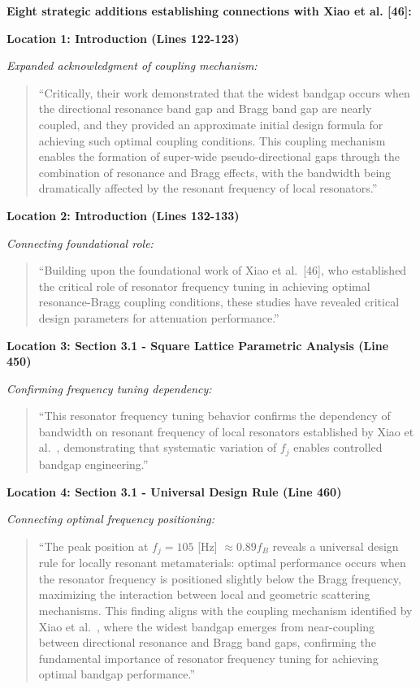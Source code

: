 \documentclass[11pt,a4paper]{article}
\newenvironment{changesbox}{%
    \par\medskip\noindent{\color{changescolor}\rule{\linewidth}{2pt}}\par
    \noindent{\color{changescolor}\bfseries Manuscript Changes}\par\smallskip
}{%
    \par\noindent{\color{changescolor}\rule{\linewidth}{0.5pt}}\medskip
}
\begin{document}
\begin{changesbox}
\textbf{Eight strategic additions establishing connections with Xiao et al. [46]:}

\textbf{Location 1: Introduction (Lines 122-123)}

\textit{Expanded acknowledgment of coupling mechanism:}
\begin{quote}
\textcolor{redtext}{``Critically, their work demonstrated that the widest bandgap occurs when the directional resonance band gap and Bragg band gap are nearly coupled, and they provided an approximate initial design formula for achieving such optimal coupling conditions. This coupling mechanism enables the formation of super-wide pseudo-directional gaps through the combination of resonance and Bragg effects, with the bandwidth being dramatically affected by the resonant frequency of local resonators.''}
\end{quote}

\textbf{Location 2: Introduction (Lines 132-133)}

\textit{Connecting foundational role:}
\begin{quote}
\textcolor{redtext}{``Building upon the foundational work of Xiao et al.~[46], who established the critical role of resonator frequency tuning in achieving optimal resonance-Bragg coupling conditions, these studies have revealed critical design parameters for attenuation performance.''}
\end{quote}

\textbf{Location 3: Section 3.1 - Square Lattice Parametric Analysis (Line 450)}

\textit{Confirming frequency tuning dependency:}
\begin{quote}
\textcolor{redtext}{``This resonator frequency tuning behavior confirms the dependency of bandwidth on resonant frequency of local resonators established by Xiao et al.~\cite{Xiao2012}, demonstrating that systematic variation of $f_j$ enables controlled bandgap engineering.''}
\end{quote}

\textbf{Location 4: Section 3.1 - Universal Design Rule (Line 460)}

\textit{Connecting optimal frequency positioning:}
\begin{quote}
\textcolor{redtext}{``The peak position at $f_j = 105$ [Hz] $\approx 0.89 f_B$ reveals a universal design rule for locally resonant metamaterials: optimal performance occurs when the resonator frequency is positioned slightly below the Bragg frequency, maximizing the interaction between local and geometric scattering mechanisms. This finding aligns with the coupling mechanism identified by Xiao et al.~\cite{Xiao2012}, where the widest bandgap emerges from near-coupling between directional resonance and Bragg band gaps, confirming the fundamental importance of resonator frequency tuning for achieving optimal bandgap performance.''}
\end{quote}


\end{changesbox}
\end{document}
